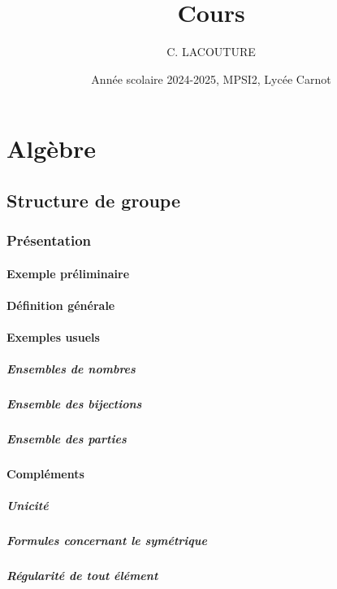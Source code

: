 \documentclass[12pt,a4paper,french]{book}
\title{Cours}
\author{C. LACOUTURE}
\date{Année scolaire 2024-2025, MPSI2, Lycée Carnot}
\begin{document}
\maketitle
\tableofcontents

\part{Algèbre}
\chapter{Structure de groupe}
	\section{Présentation}
		\subsection{Exemple préliminaire}
		\subsection{Définition générale}
		\subsection{Exemples usuels}
			\subsubsection{Ensembles de nombres}
			\subsubsection{Ensemble des bijections}
			\subsubsection{Ensemble des parties}
		\subsection{Compléments}
			\subsubsection{Unicité}
			\subsubsection{Formules concernant le symétrique}
			\subsubsection{Régularité de tout élément}
\end{document}
